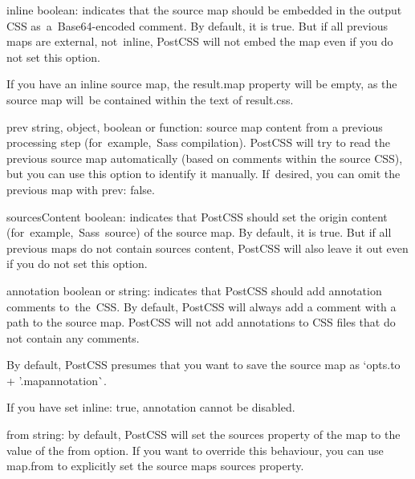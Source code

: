 \begin{DoxyItemize}
\item {\ttfamily inline} boolean\+: indicates that the source map should be embedded in the output C\+SS as a \+Base64-\/encoded comment. By default, it is {\ttfamily true}. But if all previous maps are external, not inline, Post\+C\+SS will not embed the map even if you do not set this option.

If you have an inline source map, the {\ttfamily result.\+map} property will be empty, as the source map will be contained within the text of {\ttfamily result.\+css}.
\item {\ttfamily prev} string, object, boolean or function\+: source map content from a previous processing step (for example, \+Sass compilation). Post\+C\+SS will try to read the previous source map automatically (based on comments within the source C\+SS), but you can use this option to identify it manually. If desired, you can omit the previous map with {\ttfamily prev\+: false}.
\item {\ttfamily sources\+Content} boolean\+: indicates that Post\+C\+SS should set the origin content (for example, \+Sass source) of the source map. By default, it is {\ttfamily true}. But if all previous maps do not contain sources content, Post\+C\+SS will also leave it out even if you do not set this option.
\item {\ttfamily annotation} boolean or string\+: indicates that Post\+C\+SS should add annotation comments to the \+C\+SS. By default, Post\+C\+SS will always add a comment with a path to the source map. Post\+C\+SS will not add annotations to C\+SS files that do not contain any comments.

By default, Post\+C\+SS presumes that you want to save the source map as `opts.\+to + '.mapannotation\`{}.

If you have set {\ttfamily inline\+: true}, annotation cannot be disabled.
\item {\ttfamily from} string\+: by default, Post\+C\+SS will set the {\ttfamily sources} property of the map to the value of the {\ttfamily from} option. If you want to override this behaviour, you can use {\ttfamily map.\+from} to explicitly set the source map\textquotesingle{}s {\ttfamily sources} property. 
\end{DoxyItemize}